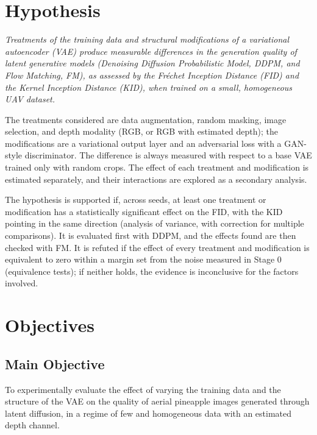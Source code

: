 \section{Hypothesis}

\begin{center}
\begin{minipage}{0.92\textwidth}
\centering\itshape
Treatments of the training data and structural modifications of a variational autoencoder (VAE) produce measurable differences in the generation quality of latent generative models (Denoising Diffusion Probabilistic Model, DDPM, and Flow Matching, FM), as assessed by the Fr\'echet Inception Distance (FID) and the Kernel Inception Distance (KID), when trained on a small, homogeneous UAV dataset.
\end{minipage}
\end{center}

The treatments considered are data augmentation, random masking, image selection, and depth modality (RGB, or RGB with estimated depth); the modifications are a variational output layer and an adversarial loss with a GAN-style discriminator. The difference is always measured with respect to a base VAE trained only with random crops. The effect of each treatment and modification is estimated separately, and their interactions are explored as a secondary analysis.

The hypothesis is supported if, across seeds, at least one treatment or modification has a statistically significant effect on the FID, with the KID pointing in the same direction (analysis of variance, with correction for multiple comparisons). It is evaluated first with DDPM, and the effects found are then checked with FM. It is refuted if the effect of every treatment and modification is equivalent to zero within a margin set from the noise measured in Stage 0 (equivalence tests); if neither holds, the evidence is inconclusive for the factors involved.

\section{Objectives}

\subsection{Main Objective}

To experimentally evaluate the effect of varying the training data and the structure of the VAE on the quality of aerial pineapple images generated through latent diffusion, in a regime of few and homogeneous data with an estimated depth channel.


